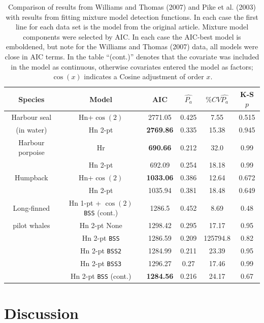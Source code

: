 \documentclass[useAMS,referee]{biom}
\begin{document}
\begin{table}
\caption{Comparison of results from Williams and Thomas (2007) and Pike et al. (2003) with results from fitting mixture model detection functions. In each case the first line for each data set is the model from the original article. Mixture model components were selected by AIC. In each case the AIC-best model is emboldened, but note for the Williams and Thomas (2007) data, all models were close in AIC terms. In the table ``(cont.)'' denotes that the covariate was included in the model as continuous, otherwise covariates entered the model as factors; $\cos(x)$ indicates a Cosine adjustment of order $x$.}
\centering
\begin{tabular}{c c c c c c}
\hline \hline
Species & Model & AIC & $\hat{P_a}$ & $\% CV \hat{P_a}$ & K-S $p$\\
\hline
Harbour seal & Hn+$\cos(2)$ & 2771.05 & 0.425 & 7.55 & 0.515\\
(in water) & Hn 2-pt  & \textbf{2769.86} & 0.335 & 15.38 & 0.945\\
Harbour porpoise & Hr  & \textbf{690.66} & 0.212 & 32.0 & 0.99\\
 & Hn 2-pt & 692.09 & 0.254 & 18.18 & 0.99\\
Humpback & Hn+$\cos(2)$ & \textbf{1033.06} & 0.386 & 12.64 & 0.672 \\
 & Hn 2-pt & 1035.94 & 0.381 & 18.48 & 0.649 \\
Long-finned & Hn 1-pt + $\cos(2)$ \texttt{BSS} (cont.) & 1286.5 & 0.452 & 8.69 & 0.48\\ %
pilot whales  & Hn 2-pt  None  &  1298.42  &  0.295  &  17.17  &  0.95 \\
 & Hn 2-pt  \texttt{BSS}  &  1286.59  &  0.209  &  125794.8  &  0.82 \\
 & Hn 2-pt  \texttt{BSS2}  &  1284.99  &  0.211  &  23.39  &  0.95 \\
 & Hn 2-pt  \texttt{BSS3}  &  1296.27  &  0.27  &  17.46  &  0.99 \\
 & Hn 2-pt  \texttt{BSS} (cont.) &  \textbf{1284.56}  &  0.216  &  24.17  &  0.67 \\
\hline
\end{tabular}
\label{williams-pike-table}
\end{table}

\section{Discussion}
\label{s:discuss}
\end{document}
